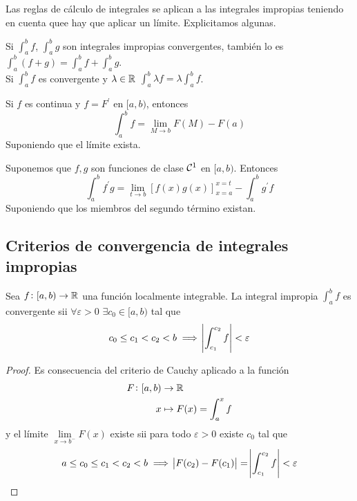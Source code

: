 \begin{obs}
	Las reglas de cálculo de integrales se aplican a las integrales impropias
	teniendo en cuenta quee hay que aplicar un límite. Explicitamos algunas.
\end{obs}

\begin{prop}[Linealidad]
	Si $\int^b_a f$, $\int^b_a g$ son integrales impropias convergentes, tambi\'en
	lo es $\int^b_a (f+g) = \int^b_a f + \int^b_a g$.
	\\
	Si $\int^b_a f$ es convergente y $\lambda \in \mathbb{R}$ $\int^b_a \lambda f =
	\lambda \int^b_a f$.
\end{prop}

\begin{prop}
	Si $f$ es continua y $f = F^\prime$ en $[a,b)$, entonces
	\[
		\int^b_a f = \lim_{M \to b} F(M) - F(a)
	\]
	Suponiendo que el límite exista.
\end{prop}

\begin{prop}
	Suponemos que $f,g$ son funciones de clase $\mathcal{C}^1$ en $[a,b)$. Entonces
	\[
		\int^b_a f^\prime g = \lim_{t \to b} \left[ f(x)g(x)\right]^{x=t}_{x=a}
		- \int^b_a g^\prime f
	\]
	Suponiendo que los miembros del segundo t\'ermino existan.
\end{prop}



\subsection{Criterios de convergencia de integrales impropias}

\begin{prop}
	Sea $f \colon [a,b) \to \mathbb{R}$ una función localmente integrable. La integral
	impropia $\int^b_a f$ es convergente sii $\forall \varepsilon > 0$ $\exists c_0
	\in [a,b)$ tal que
	\[
		c_0 \leq c_1 < c_2 < b \implies \abs{\int^{c_2}_{c_1} f} < \varepsilon
	\]
\end{prop}
\begin{proof}
Es consecuencia del criterio de Cauchy aplicado a la función
	\[\begin{aligned}
		F \colon [a,b) &\to \mathbb{R} \\
		x &\mapsto F(x) = \int^x_a f
	\end{aligned}\]
	y el límite $\lim\limits_{x \to b^-}F(x)$ existe sii para todo $\varepsilon >0$
	existe $c_0$ tal que
	\[
		a \leq c_0 \leq c_1 < c_2 < b \implies\abs{F(c_2)-F(c_1)} =
		\abs{\int^{c_2}_{c_1} f} < \varepsilon		
	\]
\end{proof}

